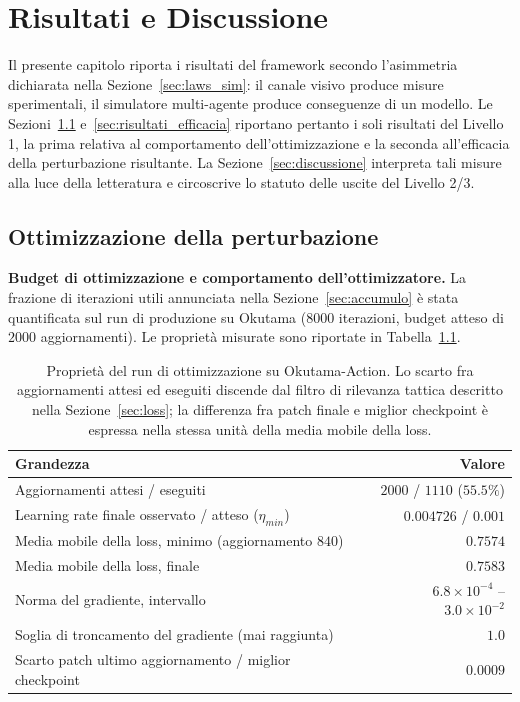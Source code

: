 \documentclass[a4paper,12pt]{report}
\begin{document}
\chapter{Risultati e Discussione}
\label{cap5}

Il presente capitolo riporta i risultati del framework secondo l'asimmetria dichiarata nella Sezione~\ref{sec:laws_sim}: il canale visivo produce misure sperimentali, il simulatore multi-agente produce conseguenze di un modello. Le Sezioni~\ref{sec:risultati_ottimizzazione} e~\ref{sec:risultati_efficacia} riportano pertanto i soli risultati del Livello 1, la prima relativa al comportamento dell'ottimizzazione e la seconda all'efficacia della perturbazione risultante. La Sezione~\ref{sec:discussione} interpreta tali misure alla luce della letteratura e circoscrive lo statuto delle uscite del Livello 2/3.

\section{Ottimizzazione della perturbazione}
\label{sec:risultati_ottimizzazione}

\textbf{Budget di ottimizzazione e comportamento dell'ottimizzatore.}
\label{sec:budget_effettivo}
La frazione di iterazioni utili annunciata nella Sezione~\ref{sec:accumulo} è stata quantificata sul run di produzione su Okutama ($8000$ iterazioni, budget atteso di $2000$ aggiornamenti). Le proprietà misurate sono riportate in Tabella~\ref{tab:budget_okutama}.

\begin{table}[t]
\centering
\begin{tabular}{lr}
\toprule
Grandezza & Valore \\
\midrule
Aggiornamenti attesi / eseguiti & $2000$ / $1110$ ($55.5\%$) \\
Learning rate finale osservato / atteso ($\eta_{min}$) & $0.004726$ / $0.001$ \\
Media mobile della loss, minimo (aggiornamento $840$) & $0.7574$ \\
Media mobile della loss, finale & $0.7583$ \\
Norma del gradiente, intervallo & $6.8\times10^{-4}$ -- $3.0\times10^{-2}$ \\
Soglia di troncamento del gradiente (mai raggiunta) & $1.0$ \\
Scarto patch ultimo aggiornamento / miglior checkpoint & $0.0009$ \\
\bottomrule
\end{tabular}
\caption{Proprietà del run di ottimizzazione su Okutama-Action. Lo scarto fra aggiornamenti attesi ed eseguiti discende dal filtro di rilevanza tattica descritto nella Sezione~\ref{sec:loss}; la differenza fra patch finale e miglior checkpoint è espressa nella stessa unità della media mobile della loss.}
\label{tab:budget_okutama}
\end{table}
\end{document}
